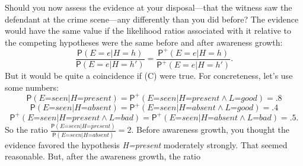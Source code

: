 \documentclass[
  11pt,
  dvipsnames,enabledeprecatedfontcommands]{scrartcl}
\newcommand{\pr}[1]{\ensuremath{\mathsf{P}(#1)}}
\newcommand{\ppr}[2]{\ensuremath{\mathsf{P}^{#1}(#2)}}
\begin{document}
Should you now assess the evidence at your disposal---that the witness
saw the defendant at the crime scene---any differently than you did
before? The evidence would have the same value if the likelihood ratios
associated with it relative to the competing hypotheses were the same
before and after awareness growth:
\[\frac{\pr{E=e \vert H=h}}{\pr{E=e \vert H=h'}}= \frac{\ppr{+}{E=e \vert H=h}}{\ppr{+}{E=e \vert H=h'}} \tag{C}.\]
But it would be quite a coincidence if (C) were true. For concreteness,
let's use some numbers:
\[\pr{\textit{E=seen} \vert \textit{H=present}}=\ppr{+}{\textit{E=seen} \vert \textit{H=present} \wedge \textit{L=good}}=.8\]
\[\pr{\textit{E=seen} \vert \textit{H=absent}}=\ppr{+}{\textit{E=seen} \vert \textit{H=absent} \wedge \textit{L=good}}=.4\]
\[\ppr{+}{\textit{E=seen} \vert \textit{H=present} \wedge \textit{L=bad}} = \ppr{+}{\textit{E=seen} \vert \textit{H=absent} \wedge \textit{L=bad}}=.5.\]
So the ratio
\(\frac{\pr{\textit{E=seen} \vert \textit{H=present}}}{\pr{\textit{E=seen} \vert \textit{H=absent}}}=2\).
Before awareness growth, you thought the evidence favored the hypothesis
\textit{H=present} moderately strongly. That seemed reasonable. But,
after the awareness growth, the ratio
\end{document}
